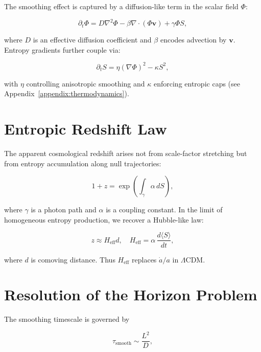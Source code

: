 \documentclass[12pt]{report}
\begin{document}
The smoothing effect is captured by a diffusion-like term in the scalar field $\Phi$:

\begin{equation}
\partial_t \Phi = D \nabla^2 \Phi - \beta \nabla \cdot (\Phi \mathbf{v}) + \gamma \Phi S,
\label{eq:grad-smoothing}
\end{equation}

where $D$ is an effective diffusion coefficient and $\beta$ encodes advection by $\mathbf{v}$.  
Entropy gradients further couple via:

\begin{equation}
\partial_t S = \eta (\nabla \Phi)^2 - \kappa S^2,
\label{eq:entropy-smoothing}
\end{equation}

with $\eta$ controlling anisotropic smoothing and $\kappa$ enforcing entropic caps (see Appendix~\ref{appendix:thermodynamics}).

\section{Entropic Redshift Law}

The apparent cosmological redshift arises not from scale-factor stretching but from entropy accumulation along null trajectories:

\begin{equation}
1+z = \exp\!\left(\int_\gamma \alpha \, dS \right),
\label{eq:entropic-redshift}
\end{equation}

where $\gamma$ is a photon path and $\alpha$ is a coupling constant.  
In the limit of homogeneous entropy production, we recover a Hubble-like law:

\begin{equation}
z \approx H_{\text{eff}} d, 
\quad H_{\text{eff}} = \alpha \, \frac{d\langle S \rangle}{dt},
\end{equation}

where $d$ is comoving distance. Thus $H_{\text{eff}}$ replaces $\dot{a}/a$ in $\Lambda$CDM.

\section{Resolution of the Horizon Problem}

The smoothing timescale is governed by

\begin{equation}
\tau_{\text{smooth}} \sim \frac{L^2}{D},
\end{equation}
\end{document}
